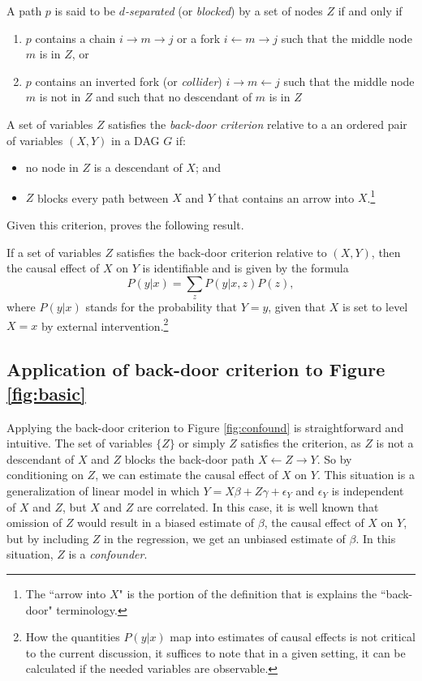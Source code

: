 \documentclass[11pt,reqno,titlepage]{amsart}
\begin{document}
\begin{definition}
A path $p$ is said to be \emph{$d$-separated} (or \emph{blocked}) by a set of nodes $Z$ if and only if
\begin{enumerate}
	\item $p$ contains a chain $i \rightarrow m \rightarrow j$ or a fork $i \leftarrow m \rightarrow j$ such that the middle node $m$ is in $Z$, or
	\item $p$ contains an inverted fork (or \emph{collider}) $i \rightarrow m \leftarrow j$ such that the middle node $m$ is not in $Z$ and such that no descendant of $m$ is in $Z$
\end{enumerate}
\end{definition}

\begin{definition}
A set of variables $Z$ satisfies the \emph{back-door criterion} relative to a an ordered pair of variables $(X, Y)$ in a 
	DAG $G$ if:
	\begin{itemize}
		\item no node in $Z$ is a descendant of $X$; and
		\item $Z$ blocks every path between $X$ and $Y$ that contains an arrow into $X$.\footnote{The ``arrow into $X$" is the portion of the definition that is explains the ``back-door" terminology.}
	\end{itemize}
\end{definition}%
Given this criterion, \citet[p.\,79]{Pearl:2009vo} proves the following result.
%
\begin{theorem}
	If a set of variables $Z$ satisfies the back-door criterion relative to $(X, Y)$, then the causal effect of $X$ on $Y$ is identifiable and is given by the formula 
	\[ P(y | x) = \sum_{z} P(y | x, z) P(z), \]
where $P(y|x)$ stands for the probability that $Y = y$, given that $X$ is set to level $X=x$ by external intervention.\footnote{
How the quantities $P(y|x)$ map into estimates of causal effects is not critical to the current discussion, it suffices to note that in a given setting, it can be calculated if the needed variables are observable.}
\end{theorem}
%

 \subsection{Application of back-door criterion to Figure \ref{fig:basic}}
Applying the back-door criterion to Figure \ref{fig:confound} is straightforward and intuitive.
The set of variables $\{Z\}$ or simply $Z$ satisfies the criterion, as $Z$ is not a descendant of $X$ and $Z$ blocks the back-door path $X \leftarrow Z \rightarrow Y$.
So by conditioning on $Z$, we can estimate the causal effect of $X$ on $Y$.
This situation is a generalization of linear model in which $Y = X \beta + Z \gamma + \epsilon_Y$ and $\epsilon_Y$ is independent of $X$ and $Z$, but $X$ and $Z$ are correlated.
In this case, it is well known that omission of $Z$ would result in a biased estimate of $\beta$, the causal effect of $X$ on $Y$, but by including $Z$ in the regression, we get an unbiased estimate of $\beta$.
In this situation, $Z$ is a \emph{confounder}.
\end{document}
